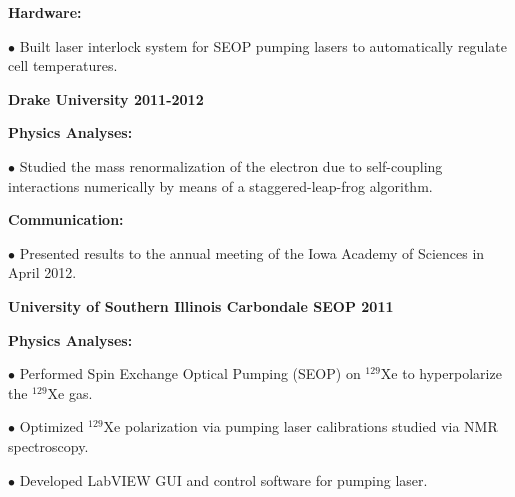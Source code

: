 \documentclass[letterpaper,10pt]{article}
\renewenvironment{itemize}{
  \begin{list}{}{
    \setlength{\leftmargin}{1.5em}
  }
}{
  \end{list}
}
\begin{document}
{\begin{itemize}
\begin{itemize}
  \item \textbf{Hardware:}
    \begin{itemize}\itemsep5pt
     \item $\bullet$ Built laser interlock system for SEOP pumping lasers to automatically regulate cell temperatures. 
    \end{itemize}
 
\end{itemize}

\vspace{3mm}

\item {\large {\bf Drake University 2011-2012} }
 \begin{itemize}\itemsep5pt \parskip0pt 
  \item \textbf{Physics Analyses:} 
    \begin{itemize}\itemsep5pt \parskip0pt 
     \item $\bullet$ Studied the mass renormalization of the electron due to self-coupling interactions numerically by means of a staggered-leap-frog algorithm.   
     \end{itemize}
     
    \item \textbf{Communication:}
	\begin{itemize}\itemsep5pt
		\item $\bullet$ Presented results to the annual meeting of the Iowa Academy of Sciences in April 2012.
	\end{itemize}
     
\end{itemize}

\vspace{3mm}

\item {\large {\bf University of Southern Illinois Carbondale SEOP 2011 } }
 \begin{itemize}\itemsep5pt \parskip0pt 
  \item \textbf{Physics Analyses:} 
    \begin{itemize}\itemsep5pt \parskip0pt 
     \item $\bullet$ Performed Spin Exchange Optical Pumping (SEOP) on $^{129}$Xe to hyperpolarize the $^{129}$Xe gas.
     \item $\bullet$ Optimized $^{129}$Xe polarization via pumping laser calibrations studied via NMR spectroscopy. 
     \item $\bullet$ Developed LabVIEW GUI and control software for pumping laser. 
     \end{itemize}


\end{itemize}
\end{itemize}}
\end{document}

